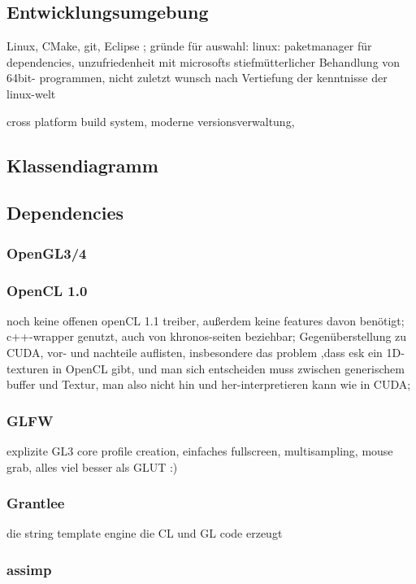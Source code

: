 
\label{sec:systemArchitecture}

\subsection{Entwicklungsumgebung}

	Linux, CMake, git, Eclipse ; 
	gründe für auswahl:
		linux:  paketmanager für dependencies, unzufriedenheit mit microsofts stiefmütterlicher Behandlung von 64bit-		
			programmen, nicht zuletzt wunsch nach Vertiefung der kenntnisse der linux-welt
	
	cross platform build system, moderne versionsverwaltung, 	
 

\subsection{Klassendiagramm}

\subsection{Dependencies}

	
	\subsubsection{OpenGL3/4}
    \subsubsection{OpenCL 1.0}
    	noch keine offenen openCL 1.1 treiber, außerdem keine features davon benötigt;
    	c++-wrapper genutzt, auch von khronos-seiten beziehbar;
    	Gegenüberstellung zu CUDA, vor- und nachteile auflisten, insbesondere das problem ,dass esk ein 1D-texturen in OpenCL gibt, und man sich entscheiden muss zwischen generischem buffer und Textur, man also nicht hin und her-interpretieren kann wie in CUDA;
    \subsubsection{GLFW}
    	explizite GL3 core profile creation, einfaches fullscreen, multisampling, mouse grab, alles viel besser als GLUT :)
    \subsubsection{Grantlee}
       die string template engine die CL und GL code erzeugt
    \subsubsection{assimp}
